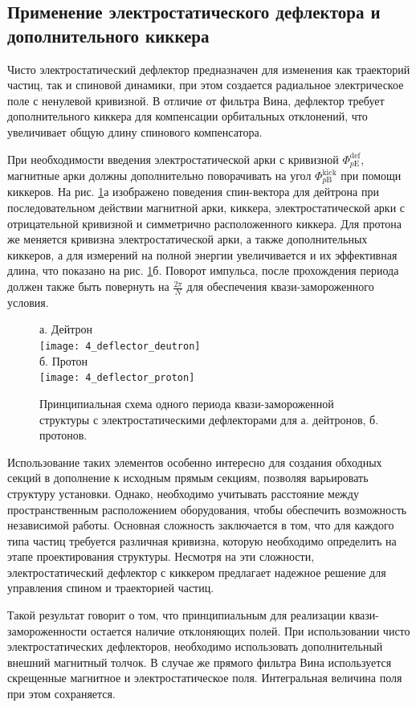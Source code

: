 	\subsection{Применение электростатического дефлектора и дополнительного киккера}

\par Чисто электростатический дефлектор предназначен для изменения как траекторий частиц, так и спиновой динамики, при этом создается радиальное электрическое поле с ненулевой кривизной. В отличие от фильтра Вина, дефлектор требует дополнительного киккера для компенсации орбитальных отклонений, что увеличивает общую длину спинового компенсатора. 
\par При необходимости введения электростатической арки с кривизной $\Phi_{p\textrm{E}}^{\textrm{def}}$, магнитные арки должны дополнительно поворачивать на угол $\Phi_{p\textrm{B}}^{\textrm{kick}}$ при помощи киккеров. На рис. \ref{fig:4_arc_B_E}а изображено поведения спин-вектора для дейтрона при последовательном действии магнитной арки, киккера, электростатической арки с отрицательной кривизной и симметрично расположенного киккера. Для протона же меняется кривизна электростатической арки, а также дополнительных киккеров, а для измерений на полной энергии увеличивается и их эффективная длина, что показано на рис. \ref{fig:4_arc_B_E}б. Поворот импульса, после прохождения периода должен также быть повернуть на $\frac{2\pi}{N}$ для обеспечения квази-замороженного условия.

\begin{figure} [h!]
	\centering
	а. Дейтрон\\
	\texttt{[image: 4\_deflector\_deutron]}\\
	б. Протон\\
	\texttt{[image: 4\_deflector\_proton]}
	\caption{Принципиальная схема одного периода квази-замороженной структуры с электростатическими дефлекторами для а. дейтронов, б. протонов.}
	\label{fig:4_arc_B_E}
\end{figure}

\par Использование таких элементов особенно интересно для создания обходных секций в дополнение к исходным прямым секциям, позволяя варьировать структуру установки. Однако, необходимо учитывать расстояние между пространственным расположением оборудования, чтобы обеспечить возможность независимой работы. Основная сложность заключается в том, что для каждого типа частиц требуется различная кривизна, которую необходимо определить на этапе проектирования структуры. Несмотря на эти сложности, электростатический дефлектор с киккером предлагает надежное решение для управления спином и траекторией частиц.
\newline
\par Такой результат говорит о том, что принципиальным для реализации квази-замороженности остается наличие отклоняющих полей. При использовании чисто электростатических дефлекторов, необходимо использовать дополнительный внешний магнитный толчок. В случае же прямого фильтра Вина используется скрещенные магнитное и электростатическое поля. Интегральная величина поля при этом сохраняется.

